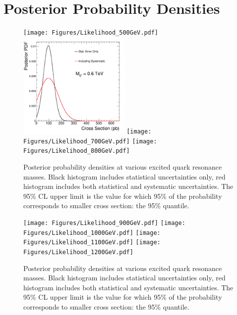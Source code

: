 \section{Posterior Probability Densities}
\label{appLike}

\begin{figure}[!ht]
  \begin{center}
     \texttt{[image: Figures/Likelihood\_500GeV.pdf]}
     \includegraphics[width=0.48\textwidth]{Figures/Likelihood_600GeV.pdf}
     \texttt{[image: Figures/Likelihood\_700GeV.pdf]}
     \texttt{[image: Figures/Likelihood\_800GeV.pdf]}
 \caption{Posterior probability densities at
 various excited quark resonance masses.  Black histogram includes statistical
 uncertainties only, red histogram includes both statistical and systematic
 uncertainties. The 95\% CL upper limit is the value for which 95\% of 
 the probability corresponds to smaller cross section: the 95\% quantile.}
    \label{likeli}
  \end{center}
\end{figure}

\clearpage

\begin{figure}[!ht]
  \begin{center}
     \texttt{[image: Figures/Likelihood\_900GeV.pdf]}
     \texttt{[image: Figures/Likelihood\_1000GeV.pdf]}
     \texttt{[image: Figures/Likelihood\_1100GeV.pdf]}
     \texttt{[image: Figures/Likelihood\_1200GeV.pdf]}

 \caption{Posterior probability densities at
 various excited quark resonance masses.  Black histogram includes statistical
 uncertainties only, red histogram includes both statistical and systematic
 uncertainties. The 95\% CL upper limit is the value for which 95\% of 
 the probability corresponds to smaller cross section: the 95\% quantile.}
    \label{likeli2}
  \end{center}
\end{figure}

